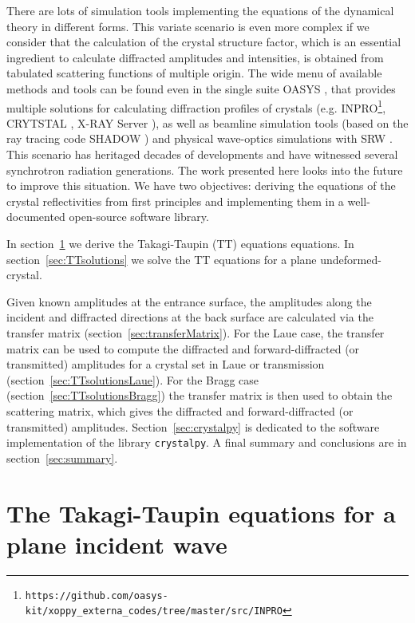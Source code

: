\documentclass[preprint]{iucr}              %
\begin{document}
There are lots of simulation tools implementing the equations of the dynamical theory in different forms. This variate scenario is even more complex if we consider that the calculation of the crystal structure factor, which is an essential ingredient to calculate diffracted amplitudes and intensities, is obtained from tabulated scattering functions of multiple origin. The wide menu of available methods and tools can be found even in the single suite OASYS \cite{codeOASYS}, that provides multiple solutions for calculating diffraction profiles of crystals (e.g. INPRO\footnote{\texttt{https://github.com/oasys-kit/xoppy\_externa\_codes/tree/master/src/INPRO}}, CRYTSTAL \cite{codeCRYSTAL}, X-RAY Server \cite{codeXRAYserver}), as well as beamline simulation tools (based on the ray tracing code SHADOW \cite{codeSHADOW}) and physical wave-optics simulations with SRW \cite{codeSRW, codeSRWcrystals}. This scenario has heritaged decades of developments and have witnessed several synchrotron radiation generations. The work presented here looks into the future to improve this situation. We have two objectives: deriving the equations of the crystal reflectivities from first principles and implementing them in a well-documented open-source software library.

In section~\ref{sec:TT} we derive the Takagi-Taupin (TT) equations \cite{Takagi1962, Taupin, Taupin1967} equations.
In section~\ref{sec:TTsolutions} we solve the TT equations for a plane undeformed-crystal.

Given known amplitudes at the entrance surface,
the amplitudes along the incident and diffracted directions at the back surface are calculated via the transfer matrix (section~\ref{sec:transferMatrix}). For the Laue case, the transfer matrix can be used to compute the diffracted and forward-diffracted (or transmitted) amplitudes for a crystal set in Laue or transmission (section~\ref{sec:TTsolutionsLaue}). For the Bragg case (section~\ref{sec:TTsolutionsBragg}) the transfer matrix is then used to obtain the scattering matrix, which gives the diffracted and forward-diffracted (or transmitted) amplitudes. 
Section~\ref{sec:crystalpy} is dedicated to the software implementation of the library \texttt{crystalpy}. A final summary and conclusions are in section~\ref{sec:summary}.

 
 
%
\section{The Takagi-Taupin equations for a plane incident wave}
\label{sec:TT}
\end{document}
